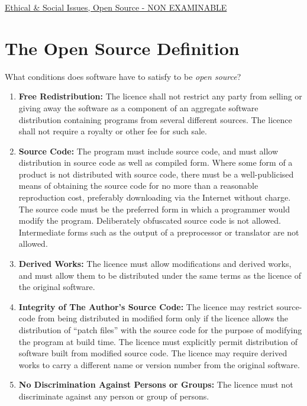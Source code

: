 \documentclass{article}
\begin{document}
\begin{center}
	\underline{\huge Ethical \& Social Issues, Open Source - NON EXAMINABLE}
\end{center}






\section{The Open Source Definition}
What conditions does software have to satisfy to be \emph{open source}?


\begin{enumerate}
\item {\bf Free Redistribution:}
The licence shall not restrict any party from selling or giving away the software as a component of an aggregate software distribution containing programs from several different sources. The licence shall not require a royalty or other fee for such sale.

\item {\bf Source Code:}
The program must include source code, and must allow distribution in source code as well as compiled form. Where some form of a product is not distributed with source code, there must be a well-publicised means of obtaining the source code for no more than a reasonable reproduction cost, preferably downloading via the Internet without charge. The source code must be the preferred form in which a programmer would modify the program. Deliberately obfuscated source code is not allowed. Intermediate forms such as the output of a preprocessor or translator are not allowed.

\item {\bf Derived Works:}
The licence must allow modifications and derived works, and must allow them to be distributed under the same terms as the licence of the original software.

\item {\bf Integrity of The Author's Source Code:}
The licence may restrict source-code from being distributed in modified form only if the licence allows the distribution of ``patch files'' with the source code for the purpose of modifying the program at build time. The licence must explicitly permit distribution of software built from modified source code. The licence may require derived works to carry a different name or version number from the original software.

\item {\bf No Discrimination Against Persons or Groups:}
The licence must not discriminate against any person or group of persons.


\end{enumerate}
\end{document}
